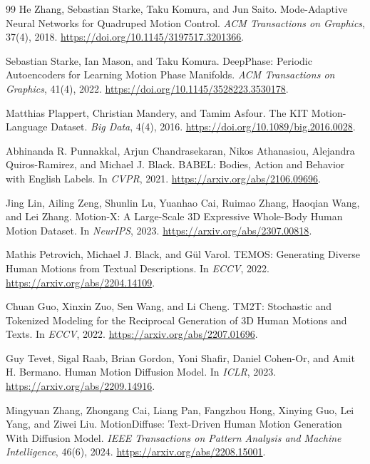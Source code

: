 \begin{thebibliography}{99}
He Zhang, Sebastian Starke, Taku Komura, and Jun Saito.
Mode-Adaptive Neural Networks for Quadruped Motion Control.
\emph{ACM Transactions on Graphics}, 37(4), 2018.
\url{https://doi.org/10.1145/3197517.3201366}.

Sebastian Starke, Ian Mason, and Taku Komura.
DeepPhase: Periodic Autoencoders for Learning Motion Phase Manifolds.
\emph{ACM Transactions on Graphics}, 41(4), 2022.
\url{https://doi.org/10.1145/3528223.3530178}.

Matthias Plappert, Christian Mandery, and Tamim Asfour.
The KIT Motion-Language Dataset.
\emph{Big Data}, 4(4), 2016.
\url{https://doi.org/10.1089/big.2016.0028}.

Abhinanda R. Punnakkal, Arjun Chandrasekaran, Nikos Athanasiou,
Alejandra Quiros-Ramirez, and Michael J. Black.
BABEL: Bodies, Action and Behavior with English Labels.
In \emph{CVPR}, 2021.
\url{https://arxiv.org/abs/2106.09696}.

Jing Lin, Ailing Zeng, Shunlin Lu, Yuanhao Cai, Ruimao Zhang,
Haoqian Wang, and Lei Zhang.
Motion-X: A Large-Scale 3D Expressive Whole-Body Human Motion Dataset.
In \emph{NeurIPS}, 2023.
\url{https://arxiv.org/abs/2307.00818}.

Mathis Petrovich, Michael J. Black, and G\"{u}l Varol.
TEMOS: Generating Diverse Human Motions from Textual Descriptions.
In \emph{ECCV}, 2022.
\url{https://arxiv.org/abs/2204.14109}.

Chuan Guo, Xinxin Zuo, Sen Wang, and Li Cheng.
TM2T: Stochastic and Tokenized Modeling for the Reciprocal Generation
of 3D Human Motions and Texts.
In \emph{ECCV}, 2022.
\url{https://arxiv.org/abs/2207.01696}.

Guy Tevet, Sigal Raab, Brian Gordon, Yoni Shafir, Daniel Cohen-Or,
and Amit H. Bermano.
Human Motion Diffusion Model.
In \emph{ICLR}, 2023.
\url{https://arxiv.org/abs/2209.14916}.

Mingyuan Zhang, Zhongang Cai, Liang Pan, Fangzhou Hong, Xinying Guo,
Lei Yang, and Ziwei Liu.
MotionDiffuse: Text-Driven Human Motion Generation With Diffusion Model.
\emph{IEEE Transactions on Pattern Analysis and Machine Intelligence},
46(6), 2024.
\url{https://arxiv.org/abs/2208.15001}.

\end{thebibliography}
